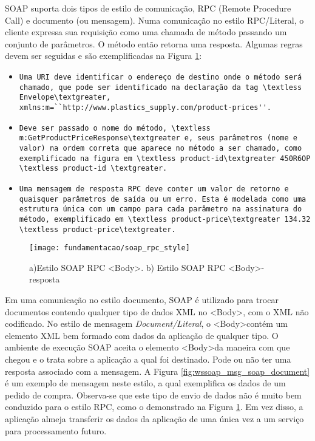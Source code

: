 SOAP suporta dois tipos de estilo de comunicação, RPC (Remote Procedure Call) e documento (ou mensagem). Numa comunicação no estilo RPC/Literal, o cliente expressa sua requisição como uma chamada de método passando um conjunto de parâmetros. O método então retorna uma resposta. Algumas regras devem ser seguidas e são exemplificadas na Figura \ref{fig:wssoap_msg_soap_rpc}:
\begin{itemize}
\item \begin{verbatim}Uma URI deve identificar o endereço de destino onde o método será chamado, que pode ser identificado na declaração da tag \textless Envelope\textgreater, xmlns:m=``http://www.plastics_supply.com/product-prices''.\end{verbatim}
\item \begin{verbatim}Deve ser passado o nome do método, \textless m:GetProductPriceResponse\textgreater e, seus parâmetros (nome e valor) na ordem correta que aparece no método a ser chamado, como exemplificado na figura em \textless product-id\textgreater 450R6OP \textless product-id \textgreater.\end{verbatim}
\item \begin{verbatim}Uma mensagem de resposta RPC deve conter um valor de retorno e quaisquer parâmetros de saída ou um erro. Esta é modelada como uma estrutura única com um campo para cada parâmetro na assinatura do método, exemplificado em \textless product-price\textgreater 134.32 \textless product-price\textgreater.\end{verbatim} 
\end{itemize}

\begin{figure}[!htb] \centering
  \centering
  \texttt{[image: fundamentacao/soap\_rpc\_style]} 
  \caption{a)Estilo SOAP RPC \textless Body\textgreater. b) Estilo SOAP RPC \textless Body\textgreater - resposta\cite{Papazoglou:2008}} 
  \label{fig:wssoap_msg_soap_rpc}
\end{figure}

Em uma comunicação no estilo documento, SOAP é utilizado para trocar documentos contendo qualquer tipo de dados XML no \textless Body\textgreater, com o XML não codificado. No estilo de mensagem \textit{Document/Literal}, o \textless Body\textgreater contém um elemento XML bem formado com dados da aplicação de qualquer tipo. O ambiente de execução SOAP aceita o elemento \textless Body\textgreater da maneira com que chegou e o trata sobre a aplicação a qual foi destinado. Pode ou não ter uma resposta associado com a mensagem. A Figura \ref{fig:wssoap_msg_soap_document} é um exemplo de mensagem neste estilo, a qual exemplifica os dados de um pedido de compra. Observa-se que este tipo de envio de dados não é muito bem conduzido para o estilo RPC, como o demonstrado na Figura \ref{fig:wssoap_msg_soap_rpc}. Em vez disso, a aplicação almeja transferir os dados da aplicação de uma única vez a um serviço para processamento futuro.\cite{Papazoglou:2008}

